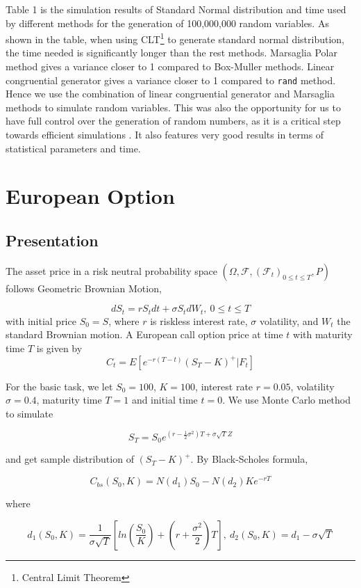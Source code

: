 \documentclass[11pt,a4paper,fleqn]{article}
\begin{document}
Table 1 is the simulation results of Standard Normal distribution and time used by different methods for the generation of 100,000,000 random variables. As shown in the table, when using CLT\footnote{Central Limit Theorem} to generate standard normal distribution, the time needed is significantly longer than the rest methods. Marsaglia Polar method gives a variance closer to 1 compared to Box-Muller methods. Linear congruential generator gives a variance closer to 1 compared to \texttt{rand} method. Hence we use the combination of linear congruential generator and Marsaglia methods to simulate random variables. This was also the opportunity for us to have full control over the generation of random numbers, as it is a critical step towards efficient simulations \cite{lectures}. It also features very good results in terms of statistical parameters and time.


\FloatBarrier

\section{European Option}

\subsection{Presentation}
The asset price in a risk neutral probability space $(\Omega, \mathcal{F}, (\mathcal{F}_t)_{0\leq t\leq T}, P)$ follows Geometric Brownian Motion,

$$dS_t=rS_tdt+\sigma S_tdW_t, \ 0\leq t \leq T$$
with initial price $S_0 = S$, where $r$ is riskless interest rate, $\sigma$ volatility, and $W_t$ the standard Brownian motion. A European call option price at time $t$ with maturity time $T$ is given by
$$C_t = E[e^{-r(T-t)}(S_T-K)^+|\textit{F}_t]$$

For the basic task, we let $S_0 = 100$, $K=100$, interest rate $r = 0.05$, volatility $\sigma = 0.4$, maturity time $T =1$ and initial time $t=0$. We use Monte Carlo method to simulate

$$S_T=S_0e^{(r-\frac{1}{2}\sigma ^2)T+\sigma \sqrt{T}Z} $$

and get sample distribution of $(S_T-K)^+$. By Black-Scholes formula,


$$C_{bs}(S_0, K) = N(d_1)S_0 - N(d_2)Ke^{-rT}$$

where

$$d_1(S_0,K)=\frac{1}{\sigma \sqrt{T}}[ln(\frac{S_0}{K})+(r+\frac{\sigma^2}{2})T],\ d_2(S_0,K) = d_1-\sigma \sqrt{T}$$
\end{document}
